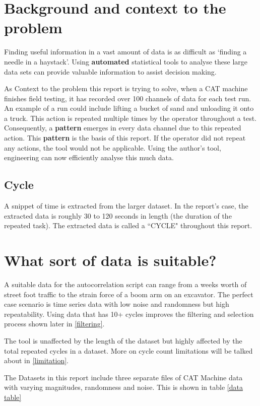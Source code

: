 \raggedright
\section{Background and context to the problem}
Finding useful information in a vast amount of data is as difficult as `finding a needle in a haystack'. Using \textbf{automated} statistical tools to analyse these large data sets can provide valuable information to assist decision making.

As Context to the problem this report is trying to solve, when a CAT machine finishes field testing, it has recorded over 100 channels of data for each test run. An example of a run could include lifting a bucket of sand and unloading it onto a truck. This action is repeated multiple times by the operator throughout a test. Consequently, a \textbf{pattern} emerges in every data channel due to this repeated action. This \textbf{pattern} is the basis of this report. If the operator did not repeat any actions, the tool would not be applicable. 
Using the author's tool, engineering can now efficiently analyse this much data. 

\subsection{Cycle}
A snippet of time is extracted from the larger dataset. In the report's case, the extracted data is roughly 30 to 120 seconds in length (the duration of the repeated task). The extracted data is called a ``CYCLE" throughout this report.

\section{What sort of data is suitable?}
A suitable data for the autocorrelation script can range from a weeks worth of street foot traffic to the strain force of a boom arm on an excavator. 
The perfect case scenario is time series data with low noise and randomness but high repeatability. Using data that has 10+ cycles improves the filtering and selection process shown later in \ref{filtering}. 

The tool is unaffected by the length of the dataset but highly affected by the total repeated cycles in a dataset. More on cycle count limitations will be talked about in \ref{limitation}.

The Datasets in this report include three separate files of CAT Machine data with varying magnitudes, randomness and noise. This is shown in table \ref{data table}

